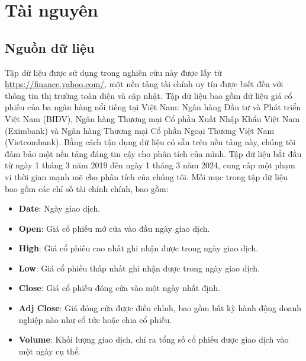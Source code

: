 \section{Tài nguyên}
\subsection{Nguồn dữ liệu}
Tập dữ liệu được sử dụng trong nghiên cứu này được lấy từ \underline{\href{https://finance.yahoo.com/}{https://finance.yahoo.com/}}, một nền tảng tài chính uy tín được biết đến với thông tin thị trường toàn diện và cập nhật. Tập dữ liệu bao gồm dữ liệu giá cổ phiếu của ba ngân hàng nổi tiếng tại Việt Nam: Ngân hàng Đầu tư và Phát triển Việt Nam (BIDV), Ngân hàng Thương mại Cổ phần Xuất Nhập Khẩu Việt Nam (Eximbank) và Ngân hàng Thương mại Cổ phần Ngoại Thương Việt Nam (Vietcombank). Bằng cách tận dụng dữ liệu có sẵn trên nền tảng này, chúng tôi đảm bảo một nền tảng đáng tin cậy cho phân tích của mình. Tập dữ liệu bắt đầu từ ngày 1 tháng 3 năm 2019 đến ngày 1 tháng 3 năm 2024, cung cấp một phạm vi thời gian mạnh mẽ cho phân tích của chúng tôi. Mỗi mục trong tập dữ liệu bao gồm các chỉ số tài chính chính, bao gồm:
\begin{itemize}
\item \textbf{Date}: Ngày giao dịch.
\item \textbf{Open}: Giá cổ phiếu mở cửa vào đầu ngày giao dịch.
\item \textbf{High}: Giá cổ phiếu cao nhất ghi nhận được trong ngày giao dịch.
\item \textbf{Low}: Giá cổ phiếu thấp nhất ghi nhận được trong ngày giao dịch.
\item \textbf{Close}: Giá cổ phiếu đóng cửa vào một ngày nhất định.
\item \textbf{Adj Close}: Giá đóng cửa được điều chỉnh, bao gồm bất kỳ hành động doanh nghiệp nào như cổ tức hoặc chia cổ phiếu.
\item \textbf{Volume}: Khối lượng giao dịch, chỉ ra tổng số cổ phiếu được giao dịch vào một ngày cụ thể.
\end{itemize}
